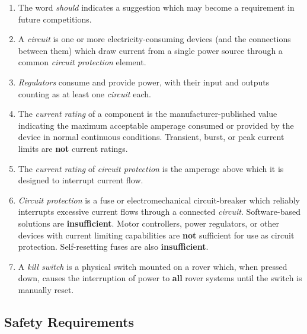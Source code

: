     \begin{enumerate}
        \item The word \textit{should} indicates a suggestion which may become a requirement in future competitions.
        \item A \textit{circuit} is one or more electricity-consuming devices (and the connections between them) which draw current from a single power source through a common \textit{circuit protection} element.
        \item \textit{Regulators} consume and provide power, with their input and outputs counting as at least one \textit{circuit} each.
        \item The \textit{current rating} of a component is the manufacturer-published value indicating the maximum acceptable amperage consumed or provided by the device in normal continuous conditions. Transient, burst, or peak current limits are \textbf{not} current ratings.
        \item The \textit{current rating} of \textit{circuit protection} is the amperage above which it is designed to interrupt current flow.
        \item \textit{Circuit protection} is a fuse or electromechanical circuit-breaker which reliably interrupts excessive current flows through a connected \textit{circuit}. Software-based solutions are \textbf{insufficient}. Motor controllers, power regulators, or other devices with current limiting capabilities are \textbf{not} sufficient for use as circuit protection. Self-resetting fuses are also \textbf{insufficient}.
        \item A \textit{kill switch} is a physical switch mounted on a rover which, when pressed down, causes the interruption of power to \textbf{all} rover systems until the switch is manually reset.
    \end{enumerate}

    \clearpage

    \subsection{Safety Requirements}
    


